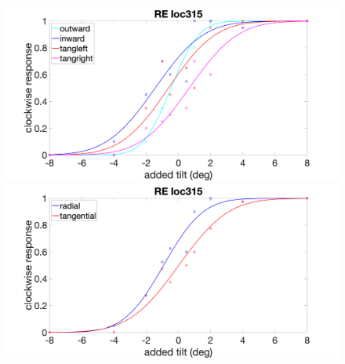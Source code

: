 \documentclass[11pt]{article} %
\begin{document}
\begin{figure}[H]
\centering %
\includegraphics[scale=.15]{Images/RE_PF_loc315_4conds.png}
\includegraphics[scale=.15]{Images/RE_PF_loc315_2conds.png}
\end{figure}

\newpage
\end{document}
